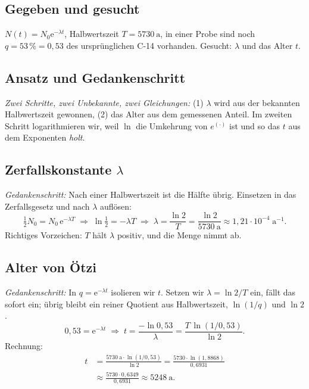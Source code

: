 
\subsection*{Gegeben und gesucht}
$N(t)=N_0\mathrm e^{-\lambda t}$, Halbwertszeit
$T=\qty{5730}{\mathrm a}$, in einer Probe sind noch $q=53\,\%=0{,}53$ des
ursprünglichen C-14 vorhanden. Gesucht: $\lambda$ und das Alter $t$.

\subsection*{Ansatz und Gedankenschritt}
\emph{Zwei Schritte, zwei Unbekannte, zwei Gleichungen:} (1) $\lambda$ wird
aus der bekannten Halbwertszeit gewonnen, (2) das Alter aus dem gemessenen
Anteil. Im zweiten Schritt logarithmieren wir, weil $\ln$ die Umkehrung
von $e^{(\cdot)}$ ist und so das $t$ aus dem Exponenten \emph{holt}.

\subsection*{Zerfallskonstante $\lambda$}
\emph{Gedankenschritt:} Nach einer Halbwertszeit ist die Hälfte übrig.
Einsetzen in das Zerfallsgesetz und nach $\lambda$ auflösen:
\begin{equation*}
  \tfrac12 N_0=N_0\,\mathrm e^{-\lambda T}
  \;\Longrightarrow\;
  \ln\tfrac12=-\lambda T
  \;\Longrightarrow\;
  \lambda=\frac{\ln 2}{T}
  =\frac{\ln 2}{\qty{5730}{\mathrm a}}
  \approx 1{,}21\cdot10^{-4}\;\mathrm{a^{-1}}.
\end{equation*}
Richtiges Vorzeichen: $T$ hält $\lambda$ positiv, und die Menge nimmt ab.

\subsection*{Alter von Ötzi}
\emph{Gedankenschritt:} In $q=\mathrm e^{-\lambda t}$ isolieren wir $t$.
Setzen wir $\lambda=\ln 2/T$ ein, fällt das sofort ein; übrig bleibt ein
reiner Quotient aus Halbwertszeit, $\ln(1/q)$ und $\ln 2$.
\begin{equation*}
  0{,}53=\mathrm e^{-\lambda t}
  \;\Longrightarrow\;
  t=\frac{-\ln 0{,}53}{\lambda}
  =\frac{T\,\ln(1/0{,}53)}{\ln 2}.
\end{equation*}
Rechnung:
\begin{align*}
  t&=\frac{\qty{5730}{\mathrm a}\cdot\ln(1/0{,}53)}{\ln 2}
  =\frac{5730\cdot\ln(1{,}8868)}{0{,}6931} \\
  &\approx\frac{5730\cdot 0{,}6349}{0{,}6931}
  \approx \qty{5248}{\mathrm a}.
\end{align*}

